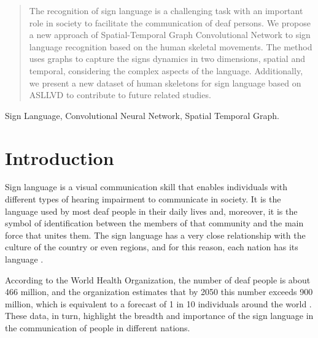 


\maketitle

\begin{abstract}
The recognition of sign language is a challenging task with an important role in society to facilitate the communication of deaf persons. We propose a new approach of Spatial-Temporal Graph Convolutional Network to sign language recognition based on the human skeletal movements. The method uses graphs to capture the signs dynamics in two dimensions, spatial and temporal, considering the complex aspects of the language. Additionally, we present a new dataset of human skeletons for sign language based on ASLLVD to contribute to future related studies.
\end{abstract}

\begin{IEEEkeywords}
Sign Language, Convolutional Neural Network, Spatial Temporal Graph.
\end{IEEEkeywords}


\section{Introduction} 
\label{sec:introduction}

Sign language is a visual communication skill that enables individuals with different types of hearing impairment to communicate in society. It is the language used by most deaf people in their daily lives and, moreover, it is the symbol of identification between the members of that community and the main force that unites them.  The sign language has a very close relationship with the culture of the country or even regions, and for this reason, each nation has its language \cite{pereira-choi-2011}.

According to the World Health Organization, the number of deaf people is about 466 million, and the organization estimates that by 2050 this number exceeds 900 million, which is equivalent to a forecast of 1 in 10 individuals around the world \cite{who-2018}. These data, in turn, highlight the breadth and importance of the sign language in the communication of people in different nations.

